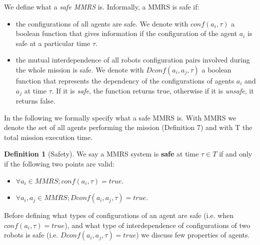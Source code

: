 \documentclass[journal]{IEEEtran}
\theoremstyle{definition}
\newtheorem{definition}{Definition}
\begin{document}
We define what a \textit{safe MMRS} is. Informally, a MMRS is safe if:
\begin{itemize}
\item the configurations of all agents are safe. We denote with $conf(a_i, \tau)$ a boolean function that gives information if the configuration of the agent $a_i$ is safe at a particular time $\tau$.
\item the mutual interdependence of all robots configuration pairs involved during the whole mission is safe. We denote with $Dconf(a_i, a_j,\tau)$ a boolean function that represents the dependency of the configurations of agents $a_i$ and $a_j$ at time $\tau$. If it is \textit{safe}, the function returns true, otherwise if it is \textit{unsafe}, it returns false.
\end{itemize}

In the following we formally specify what a safe MMRS is. With MMRS we denote the set of all agents performing the mission (Definition 7) and with T the total mission execution time. 

\begin{definition}[Safety]
We say a MMRS system is \textbf{safe} at time $\tau \in T$ if and only if the following two points are valid:
\begin{itemize}
\item  $\forall a_i \in MMRS; conf(a_i, \tau)=true$.
 \item  $\forall a_i,a_j \in MMRS; Dconf(a_i, a_j,\tau)=true$.
\end{itemize}
\end{definition}

Before defining what types of configurations of an agent are safe (i.e. when $conf(a_i, \tau)=true$), and what type of interdependence of configurations of two robots is safe (i.e. $Dconf(a_i, a_j,\tau)=true$) we discuss few properties of agents.
\end{document}
